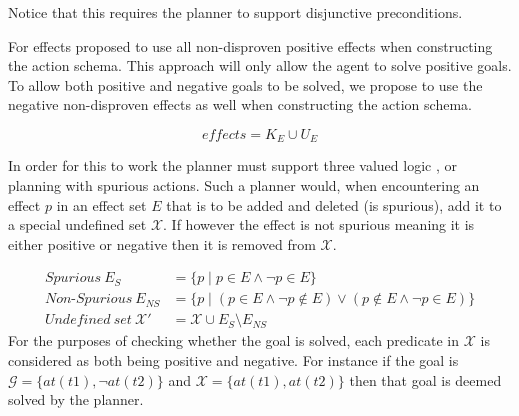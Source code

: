 \documentclass[../Master.tex]{subfiles}
\begin{document}
	Notice that this requires the planner to support disjunctive preconditions.

	For effects \cite{Walsh2008} proposed to use all non-disproven positive effects when constructing the action schema. 
	This approach will only allow the agent to solve positive goals.
	To allow both positive and negative goals to be solved, we propose to use the negative non-disproven effects as well when constructing the action schema.

	\begin{equation}
		effects =  K_E \cup U_E
	\end{equation}

	In order for this to work the planner must support three valued logic \cite{putnam1957a}, or planning with spurious actions.
	Such a planner would, when encountering an effect $p$ in an effect set $E$ that is to be added and deleted (is spurious), add it to a special undefined set $\mathcal{X}$.
	If however the effect is not spurious meaning it is either positive or negative then it is removed from $\mathcal{X}$.

			\begin{equation}
				\begin{split}
					Spurious~E_S &= \{ p \mid p \in E \land \neg p \in E \} \\
					Non\text{-}Spurious~E_{NS} &= \{ p \mid (p \in E \land \neg p \notin E ) \lor (p \notin E \land \neg p \in E )  \}\\
					Undefined ~ set ~ \mathcal{X}' &= \mathcal{X} \cup E_S \setminus E_{NS}
				\end{split}
			\end{equation}
	For the purposes of checking whether the goal is solved, each predicate in $\mathcal{X}$ is considered as both being positive and negative.
	For instance if the goal is $\mathcal{G} = \{at(t1), \neg at(t2)\}$ and $\mathcal{X} = \{at(t1), at(t2)\}$ then that goal is deemed solved by the planner.
\end{document}
